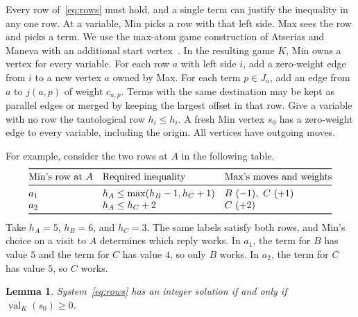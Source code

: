 \documentclass[11pt,letterpaper]{article}
\newtheorem{lemma}[theorem]{Lemma}
\newcommand{\val}{\operatorname{val}}
\begin{document}
Every row of~\eqref{eq:rows} must hold, and a single term can justify the
inequality in any one row. At a variable, Min picks a row with that left side.
Max sees the row and picks a term.
We use the max-atom game construction of Atserias and Maneva with an additional
start vertex~\cite[\S\S2--4]{am}. In the resulting game \(K\), Min owns a vertex
for every variable. For each row \(a\) with left side \(i\), add a zero-weight
edge from \(i\) to a new vertex \(a\) owned by Max. For each term \(p\in J_a\),
add an edge from \(a\) to \(j(a,p)\) of weight \(c_{a,p}\). Terms with the same
destination may be kept as parallel edges or merged by keeping the largest
offset in that row. Give a variable with no row the tautological row \(h_i\le h_i\).
A fresh Min vertex \(s_0\) has a zero-weight edge to every variable, including the
origin. All vertices have outgoing moves.

For example, consider the two rows at \(A\) in the following table.
\[
\begin{array}{@{}lll@{}}
\toprule
\text{Min's row at \(A\)} & \text{Required inequality} & \text{Max's moves and weights}\\
\midrule
a_1 & h_A\le\max(h_B-1,h_C+1) & B\ (-1),\ C\ (+1)\\
a_2 & h_A\le h_C+2            & C\ (+2)\\
\bottomrule
\end{array}
\]
Take \(h_A=5\), \(h_B=6\), and \(h_C=3\). The same labels satisfy both rows,
and Min's choice on a visit to \(A\) determines which reply works. In \(a_1\),
the term for \(B\) has value \(5\) and the term for \(C\) has value \(4\), so
only \(B\) works. In \(a_2\), the term for \(C\) has value \(5\), so \(C\) works.

\begin{lemma}\label{lem:game}
System~\eqref{eq:rows} has an integer solution if and only if \(\val_K(s_0)\ge0\).
\end{lemma}
\end{document}
